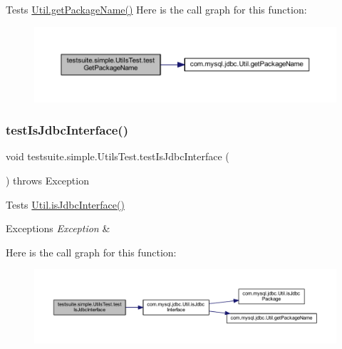 Tests \mbox{\hyperlink{classcom_1_1mysql_1_1jdbc_1_1_util_a30a2020999202ce3bb0871498f6bcc5b}{Util.\+get\+Package\+Name()}} Here is the call graph for this function\+:
\nopagebreak
\begin{figure}[H]
\begin{center}
\leavevmode
\includegraphics[width=350pt]{classtestsuite_1_1simple_1_1_utils_test_a15e2df447f329b76ef2115f6583296c0_cgraph}
\end{center}
\end{figure}
\mbox{\label{classtestsuite_1_1simple_1_1_utils_test_a5983623d2b264a98e4d7a3859d1404c7}} 
\subsubsection{\texorpdfstring{test\+Is\+Jdbc\+Interface()}{testIsJdbcInterface()}}
{\footnotesize\ttfamily void testsuite.\+simple.\+Utils\+Test.\+test\+Is\+Jdbc\+Interface (\begin{DoxyParamCaption}{ }\end{DoxyParamCaption}) throws Exception}

Tests \mbox{\hyperlink{classcom_1_1mysql_1_1jdbc_1_1_util_ad3d011a699b9fccde5f515f9fbd5b5f3}{Util.\+is\+Jdbc\+Interface()}}


\begin{DoxyExceptions}{Exceptions}
{\em Exception} & \\
\hline
\end{DoxyExceptions}
Here is the call graph for this function\+:
\nopagebreak
\begin{figure}[H]
\begin{center}
\leavevmode
\includegraphics[width=350pt]{classtestsuite_1_1simple_1_1_utils_test_a5983623d2b264a98e4d7a3859d1404c7_cgraph}
\end{center}
\end{figure}
\mbox{\label{classtestsuite_1_1simple_1_1_utils_test_acdd7d8143bc1dede650e3c5991d92193}} 
